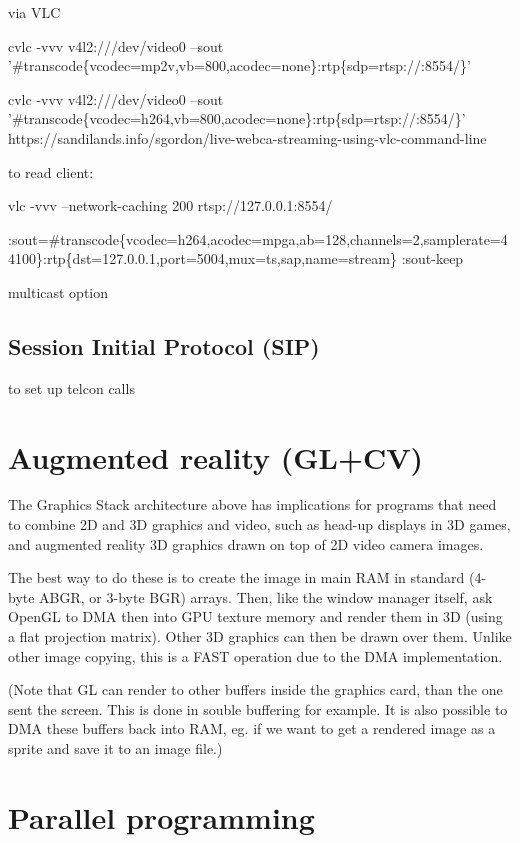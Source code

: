 \documentclass[oneside,english]{scrbook}
\begin{document}
via VLC 

cvlc -vvv v4l2:///dev/video0 --sout '\#transcode\{vcodec=mp2v,vb=800,acodec=none\}:rtp\{sdp=rtsp://:8554/\}' 

cvlc -vvv v4l2:///dev/video0 --sout '\#transcode\{vcodec=h264,vb=800,acodec=none\}:rtp\{sdp=rtsp://:8554/\}'
https://sandilands.info/sgordon/live-webca-streaming-using-vlc-command-line

to read client: 

vlc -vvv --network-caching 200 rtsp://127.0.0.1:8554/

:sout=\#transcode\{vcodec=h264,acodec=mpga,ab=128,channels=2,samplerate=44100\}:rtp\{dst=127.0.0.1,port=5004,mux=ts,sap,name=stream\}
:sout-keep

multicast option


\section{Session Initial Protocol (SIP)}

to set up telcon calls


\chapter{Augmented reality (GL+CV)}

The Graphics Stack architecture above has implications for programs that need to combine 2D and 3D graphics and video, such as head-up displays in 3D games, and augmented reality 3D graphics drawn on top of 2D video camera images.

The best way to do these is to create the image in main RAM in standard (4-byte ABGR, or 3-byte BGR) arrays. Then, like the window manager itself, ask OpenGL to DMA then into GPU texture memory and render them in 3D (using a flat projection matrix). Other 3D graphics can then be drawn over them.  Unlike other image copying, this is a FAST operation due to the DMA implementation.

(Note that GL can render to other buffers inside the graphics card, than the one sent the screen. This is done in souble buffering for example. It is also possible to DMA these buffers back into RAM, eg. if we want to get a rendered image as a sprite and save it to an image file.)

\chapter{Parallel programming}
\end{document}
